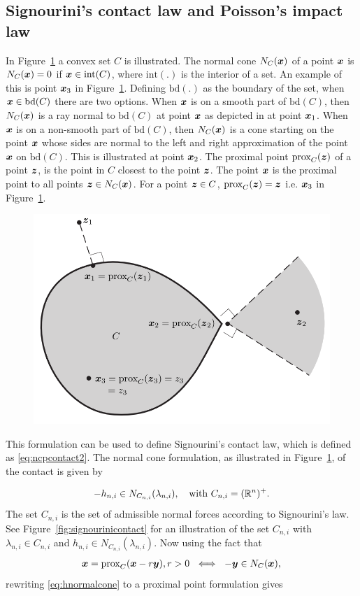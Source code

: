 \documentclass[../DC2017114Bouma.tex]{subfiles}
\begin{document}
\subsection{Signourini's contact law and Poisson's impact law}
In Figure~\ref{fig:convex} a convex set $C$ is illustrated. The normal cone $N_C({\boldsymbol{x}})$ of a point ${\boldsymbol{x}}$ is $N_C({\boldsymbol{x}})=0$ if ${\boldsymbol{x}}\in \text{int}(C)$, where $\text{int}(.)$ is the interior of a set. An example of this is point ${\boldsymbol{x}}_3$ in Figure~\ref{fig:convex}. Defining $\text{bd}(.)$ as the boundary of the set, when ${\boldsymbol{x}}\in \text{bd}(C)$ there are two options. When ${\boldsymbol{x}}$ is on a smooth part of $\text{bd}(C)$, then $N_C({\boldsymbol{x}})$ is a ray normal to $\text{bd}(C)$ at point ${\boldsymbol{x}}$ as depicted in at point ${\boldsymbol{x}}_1$. When ${\boldsymbol{x}}$ is on a non-smooth part of $\text{bd}(C)$, then $N_C({\boldsymbol{x}})$ is a cone starting on the point ${\boldsymbol{x}}$ whose sides are normal to the left and right approximation of the point ${\boldsymbol{x}}$ on $\text{bd}(C)$. This is illustrated at point ${\boldsymbol{x}}_2$. The proximal point $\operatorname{\text{prox}}_C({\boldsymbol{z}})$ of a point ${\boldsymbol{z}}$, is the point in $C$ closest to the point ${\boldsymbol{z}}$. The point ${\boldsymbol{x}}$ is the proximal point to all points  ${\boldsymbol{z}}\in N_C({\boldsymbol{x}})$. For a point ${\boldsymbol{z}}\in C$, $\operatorname{\text{prox}}_C({\boldsymbol{z}}) = {\boldsymbol{z}}$ i.e. ${\boldsymbol{x}}_3$ in Figure~\ref{fig:convex}.

\begin{figure}[h]
\centering
\includegraphics[width=.6\textwidth]{convex.PNG}\caption{}\label{fig:convex}
\end{figure}

This formulation can be used to define Signourini's contact law, which is defined as \eqref{eq:ncpcontact2}. The normal cone formulation, as illustrated in Figure~\ref{fig:convex}, of the contact is given by

\begin{align}
-h_{n,i} \in N_{C_{n,i}}(\lambda_{n,i}),\quad \text{with }C_{n,i} = (\mathbb{R}^n)^+.\label{eq:hnormalcone}
\end{align}
The set $C_{n,i}$ is the set of admissible normal forces according to Signourini's law. See Figure~\ref{fig:signourinicontact} for an illustration of the set $C_{n,i}$ with $\lambda_{n,i}\in C_{n,i}$ and $h_{n,i} \in N_{C_{n,i}}(\lambda_{n,i})$. Now using the fact that
\begin{align}
{\boldsymbol{x}} = \operatorname{\text{prox}}_C({\boldsymbol{x}} -r{\boldsymbol{y}}), r > 0\ \iff\ -{\boldsymbol{y}}\in N_C({\boldsymbol{x}}),
\end{align}
rewriting \eqref{eq:hnormalcone} to a proximal point formulation gives 
\end{document}
